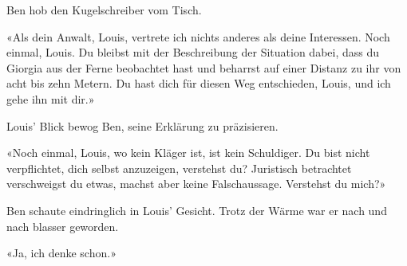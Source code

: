 Ben hob den Kugelschreiber vom Tisch. 

«Als dein Anwalt, Louis, vertrete ich nichts anderes als deine Interessen. Noch einmal, Louis. Du bleibst mit der Beschreibung der Situation dabei, dass du Giorgia aus der Ferne beobachtet hast und beharrst auf
einer Distanz zu ihr von acht bis zehn Metern. Du hast dich für diesen Weg entschieden, Louis, und ich gehe ihn mit dir.»

Louis’ Blick bewog Ben, seine Erklärung zu präzisieren.

«Noch einmal, Louis, wo kein Kläger ist, ist kein Schuldiger. Du bist nicht
verpflichtet, dich selbst anzuzeigen, verstehst du? Juristisch betrachtet verschweigst du etwas, machst aber keine Falschaussage. Verstehst du mich?»

Ben schaute eindringlich in Louis’ Gesicht. Trotz der Wärme war er 
nach und nach blasser geworden.

«Ja, ich denke schon.»
